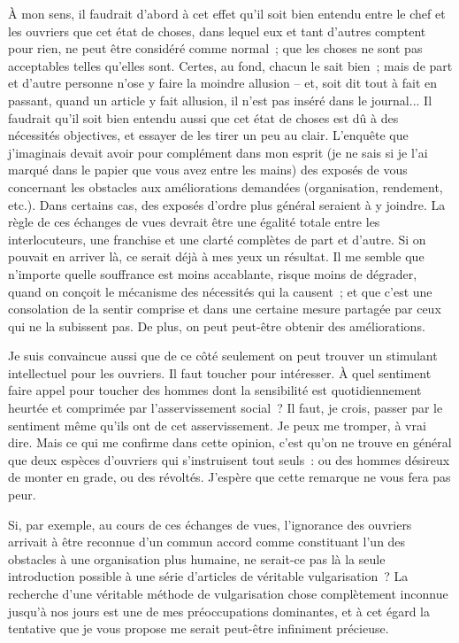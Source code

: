 \documentclass[french,twoside]{book} %
\begin{document}
À mon sens, il faudrait d'abord à cet effet qu'il soit bien entendu entre le chef et les ouvriers que cet état de choses, dans lequel eux et tant d'autres comptent pour rien, ne peut être considéré comme normal ; que les choses ne sont pas acceptables telles qu'elles sont. Certes, au fond, chacun le sait bien ; mais de part et d'autre personne n'ose y faire la moindre allusion – et, soit dit tout à fait en passant, quand un article y fait allusion, il n'est pas inséré dans le journal... Il faudrait qu'il soit bien entendu aussi que cet état de choses est dû à des nécessités objectives, et essayer de les tirer un peu au clair. L'enquête que j'imaginais devait avoir pour complément dans mon esprit (je ne sais si je l'ai marqué dans le papier que vous avez entre les mains) des exposés de vous concernant les obstacles aux améliorations demandées (organisation, rendement, etc.). Dans certains cas, des exposés d'ordre plus général seraient à y joindre. La règle de ces échanges de vues devrait être une égalité totale entre les interlocuteurs, une franchise et une clarté complètes de part et d'autre. Si on pouvait en arriver là, ce serait déjà à mes yeux un résultat. Il me semble que n'importe quelle souffrance est moins accablante, risque moins de dégrader, quand on conçoit le mécanisme des nécessités qui la causent ; et que c'est une consolation de la sentir comprise et dans une certaine mesure partagée par ceux qui ne la subissent pas. De plus, on peut peut-être obtenir des améliorations.\par
Je suis convaincue aussi que de ce côté seulement on peut trouver un stimulant intellectuel pour les ouvriers. Il faut toucher pour intéresser. À quel sentiment faire appel pour toucher des hommes dont la sensibilité est quotidiennement heurtée et comprimée par l'asservissement social ? Il faut, je crois, passer par le sentiment même qu'ils ont de cet asservissement. Je peux me tromper, à vrai dire. Mais ce qui me confirme dans cette opinion, c'est qu'on ne trouve en général que deux espèces d'ouvriers qui s'instruisent tout seuls : ou des hommes désireux de monter en grade, ou des révoltés. J'espère que cette remarque ne vous fera pas peur.\par
Si, par exemple, au cours de ces échanges de vues, l'ignorance des ouvriers arrivait à être reconnue d'un commun accord comme constituant l'un des obstacles à une organisation plus humaine, ne serait-ce pas là la seule introduction possible à une série d'articles de véritable vulgarisation ? La recherche d'une véritable méthode de vulgarisation chose complètement inconnue jusqu'à nos jours est une de mes préoccupations dominantes, et à cet égard la tentative que je vous propose me serait peut-être infiniment précieuse.\par
\end{document}
